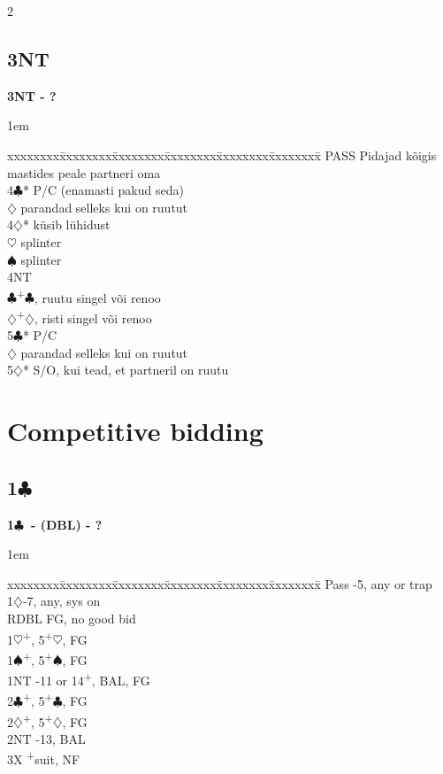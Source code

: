 \documentclass[10pt]{article}
\renewcommand{\c}{$\clubsuit$}
\renewcommand{\d}{$\diamondsuit$}
\newcommand{\h}{$\heartsuit$}
\newcommand{\s}{$\spadesuit$}
\newcommand{\p}{\textsuperscript{+}}
\newcommand{\x}{DBL}
\newcommand{\xx}{RDBL}
\newenvironment{bidtable}[1][]
{\textbf{#1}
  \begin{adjustwidth}{1em}{}
    \addvspace{2pt}
    \begin{tabbing}
      xxxxxxxx\=xxxxxxxx\=xxxxxxxx\=xxxxxxxx\=xxxxxxxx\=xxxxxxxx\=\kill}
{\end{tabbing}\end{adjustwidth}\bigskip}%
\newcommand{\pdfc}{\texorpdfstring{\c{}}{C}}
\begin{document}
\begin{multicols*}{2}
\subsection{3NT}

\begin{bidtable}[3NT - ?]
PASS \> Pidajad kõigis mastides peale partneri oma \\
4\c* \> P/C (enamasti pakud seda)                  \\
     \d \> parandad selleks kui on ruutut      \\
4\d* \> küsib lühidust                             \\
     \h \> splinter                            \\
     \s \> splinter                            \\
     \> 4NT                                 \\
     \c {}\p\c , ruutu singel või renoo      \\
     \d {}\p\d , risti singel või renoo      \\
5\c* \> P/C                                        \\
     \d \> parandad selleks kui on ruutut      \\
5\d* \> S/O, kui tead, et partneril on ruutu
\end{bidtable}

\newpage

\section{Competitive bidding}

\subsection{1\pdfc}
\begin{bidtable}[1\c\ - (\x) - ?]
Pass -5, any or trap                   \\
1\d  {}-7, any, sys on                   \\
\xx  \> FG, no good bid       \\
1\h  {}\p, 5\p\h, FG        \\
1\s  {}\p, 5\p\s, FG        \\
1NT  -11 or 14\p, BAL, FG \\
2\c  {}\p, 5\p\c, FG        \\
2\d  {}\p, 5\p\d, FG            \\
2NT  -13, BAL            \\
3X   \p suit, NF
\end{bidtable}


\end{multicols*}
\end{document}
